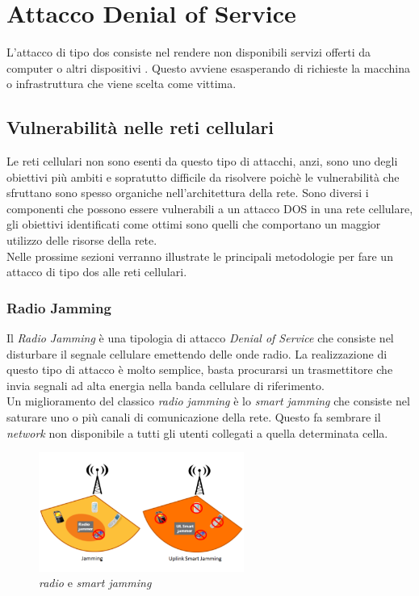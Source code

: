 \chapter{Attacco Denial of Service}
L'attacco di tipo \gls{dos} consiste nel rendere non disponibili servizi offerti da computer o altri
dispositivi \cite{dos-definition}. Questo avviene esasperando di richieste la macchina o infrastruttura che viene scelta come
vittima.

\section{Vulnerabilità nelle reti cellulari}
Le reti cellulari non sono esenti da questo tipo di attacchi, anzi, sono uno degli obiettivi più ambiti e sopratutto difficile da risolvere
poichè le vulnerabilità che sfruttano sono spesso organiche nell'architettura della rete.
Sono diversi i componenti che possono essere vulnerabili a un attacco DOS in una rete cellulare, gli obiettivi identificati come ottimi sono quelli
che comportano un maggior utilizzo delle risorse della rete.\\
Nelle prossime sezioni verranno illustrate le principali metodologie per fare un attacco di tipo \gls{dos} alle reti cellulari\cite{4g-dos-recap}.

\clearpage

\subsection{Radio Jamming}
Il \textit{Radio Jamming} è una tipologia di attacco \textit{Denial of Service} che consiste nel disturbare il segnale cellulare emettendo delle onde radio.
La realizzazione di questo tipo di attacco è molto semplice, basta procurarsi un trasmettitore che invia segnali ad alta energia nella banda cellulare di riferimento.\\
Un miglioramento del classico \textit{radio jamming} è lo \textit{smart jamming} che consiste nel saturare uno o più canali di comunicazione della rete. Questo fa sembrare 
il \textit{network} non disponibile a tutti gli utenti collegati a quella determinata cella.
\begin{figure}[h]
    \centering
    \includegraphics[width=0.6\textwidth]{images/dos-jamming.png}
    \caption{\textit{radio} e \textit{smart jamming}\cite{4g-dos-recap}}
\end{figure}\\

